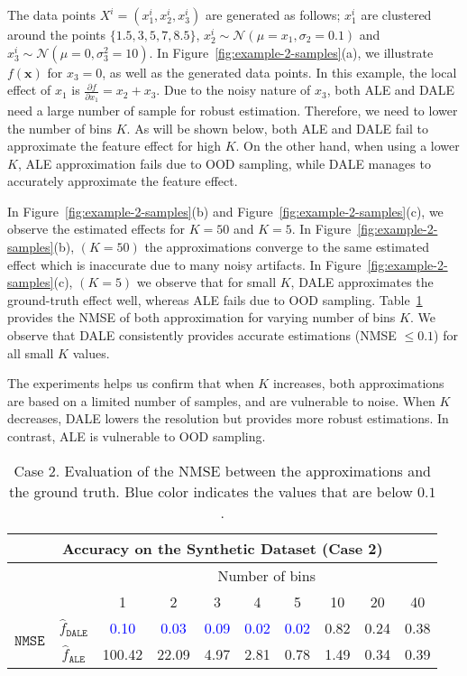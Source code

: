 \documentclass[wcp]{jmlr}
\newcommand{\dale}{\hat{f}_{\mathtt{DALE}}}
\newcommand{\alep}{\hat{f}_{\mathtt{ALE}}}
\newcommand{\xb}{\mathbf{x}}
\begin{document}
\noindent
%
The data points \(X^i = (x_1^i, x_2^i, x_3^i)\) are generated as
follows; \(x_1^i \) are clustered around the points
\(\{1.5, 3, 5, 7, 8.5\}\),
\(x_2^i \sim \mathcal{N}(\mu=x_1, \sigma_2=0.1) \) and
\(x_3^i \sim \mathcal{N}(\mu=0, \sigma_3^2=10) \). In
Figure~\ref{fig:example-2-samples}(a), we illustrate \(f(\xb)\) for
\(x_3=0\), as well as the generated data points. In this example, the
local effect of \(x_1\) is
\(\frac{\partial f}{\partial x_1} = x_2 + x_3\). Due to the noisy
nature of \(x_3\), both ALE and DALE need a large number of sample for
robust estimation. Therefore, we need to lower the number of bins
\(K\). As will be shown below, both ALE and DALE fail to approximate
the feature effect for high \(K\). On the other hand, when using a
lower \(K\), ALE approximation fails due to OOD sampling, while DALE
manages to accurately approximate the feature effect.

In Figure~\ref{fig:example-2-samples}(b) and
Figure~\ref{fig:example-2-samples}(c), we observe the estimated
effects for \(K=50\) and \(K=5\). In
Figure~\ref{fig:example-2-samples}(b), \((K=50)\) the approximations
converge to the same estimated effect which is inaccurate due to many
noisy artifacts. In Figure~\ref{fig:example-2-samples}(c), \((K=5)\)
we observe that for small \(K\), DALE approximates the ground-truth
effect well, whereas ALE fails due to OOD
sampling. Table~\ref{tab:case-2-accuracy} provides the NMSE of both
approximation for varying number of bins \(K\). We observe that DALE
consistently provides accurate estimations (NMSE \(\leq 0.1\)) for all
small \(K\) values.

The experiments helps us confirm that when \(K \) increases, both
approximations are based on a limited number of samples, and are
vulnerable to noise. When \(K\) decreases, DALE lowers the resolution
but provides more robust estimations. In contrast, ALE is vulnerable
to OOD sampling.

\begin{table}
  \centering
  \caption{Case 2. Evaluation of the NMSE between the approximations and the ground truth. Blue color indicates the values that are below \(0.1\).}
  \label{tab:case-2-accuracy}
  \begin{tabular}{c|c|c|c|c|c|c|c|c|c}
    \multicolumn{10}{c}{Accuracy on the Synthetic Dataset (Case 2)} \\
    \hline \hline
    & & \multicolumn{8}{|c}{Number of bins} \\
    \hline
    & & 1 & 2 & 3 & 4 & 5 & 10 & 20 & 40 \\
    \hline
    \hline
    \multirow{2}{*}{\(\mathtt{NMSE}\)} & \(\dale\) & \textcolor{blue}{0.10} & \textcolor{blue}{0.03} & \textcolor{blue}{0.09} & \textcolor{blue}{0.02} & \textcolor{blue}{0.02} & 0.82 & 0.24 & 0.38\\
    & \(\alep\) & 100.42 & 22.09 & 4.97 & 2.81 & 0.78 & 1.49 & 0.34 & 0.39 \\
    \hline
  \end{tabular}
\end{table}
\end{document}
